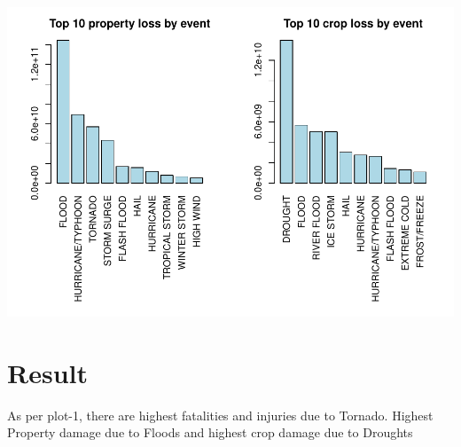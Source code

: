 \documentclass[
]{article}
\begin{document}
\includegraphics{rpubs-RR-project-2-_files/figure-latex/plotdmgloss-1.pdf}

\hypertarget{result}{%
\section{Result}\label{result}}

As per plot-1, there are highest fatalities and injuries due to Tornado.
Highest Property damage due to Floods and highest crop damage due to
Droughts
\end{document}
